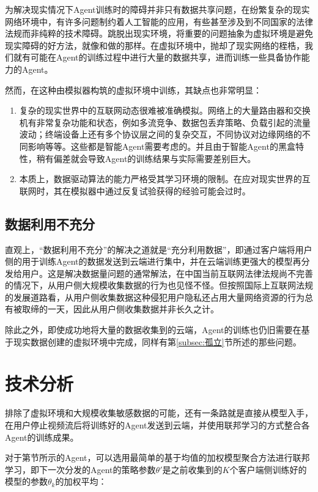 \documentclass[a4paper]{ctexart}
\begin{document}
为解决现实情况下Agent训练时的障碍并非只有数据共享问题，在纷繁复杂的现实网络环境中，有许多问题制约着人工智能的应用，有些甚至涉及到不同国家的法律法规而非纯粹的技术障碍。跳脱出现实环境，将重要的问题抽象为虚拟环境是避免现实障碍的好方法，就像\cite{mao2020real}和\cite{zhou2019learning}做的那样。在虚拟环境中，抛却了现实网络的桎梏，我们就有可能在Agent的训练过程中进行大量的数据共享，进而训练一些具备协作能力的Agent。

然而，在这种由模拟器构筑的虚拟环境中训练，其缺点也非常明显：
\begin{enumerate}[label=\arabic*、]
	\item 复杂的现实世界中的互联网动态很难被准确模拟\cite{yan2018pantheon}。网络上的大量路由器和交换机有非常复杂功能和状态，例如多流竞争、数据包丢弃策略、负载引起的流量波动；终端设备上还有多个协议层之间的复杂交互，不同协议对边缘网络的不同影响等等。这些都是智能Agent需要考虑的。并且由于智能Agent的黑盒特性，稍有偏差就会导致Agent的训练结果与实际需要差别巨大。
	\item 本质上，数据驱动算法的能力严格受其学习环境的限制。在应对现实世界的互联网时，其在模拟器中通过反复试验获得的经验可能会过时。
\end{enumerate}

\subsection{数据利用不充分}

直观上，“数据利用不充分”的解决之道就是“充分利用数据”，即通过客户端将用户侧的用于训练Agent的数据发送到云端进行集中，并在云端训练更强大的模型再分发给用户。这是解决数据量问题的通常解法，在中国当前互联网法律法规尚不完善的情况下，从用户侧大规模收集数据的行为也见怪不怪。但按照国际上互联网法规的发展道路看，从用户侧收集数据这种侵犯用户隐私还占用大量网络资源的行为总有被取缔的一天，因此从用户侧收集数据并非长久之计。

除此之外，即使成功地将大量的数据收集到的云端，Agent的训练也仍旧需要在基于现实数据创建的虚拟环境中完成，同样有第\ref{subsec:孤立}节所述的那些问题。

\section{技术分析}\label{sec:技术分析}

排除了虚拟环境和大规模收集敏感数据的可能，还有一条路就是直接从模型入手，在用户停止视频流后将训练好的Agent发送到云端，并使用联邦学习的方式整合各Agent的训练成果。

对于第\label{sec:智能Agent结构}节所示的Agent，可以选用最简单的基于均值的加权模型聚合方法进行联邦学习\cite{goodfellow2014qualitatively,mcmahan2017communication}，即下一次分发的Agent的策略参数$\theta'$是之前收集到的$K$个客户端侧训练好的模型的参数$\theta_k$的加权平均：
\end{document}
